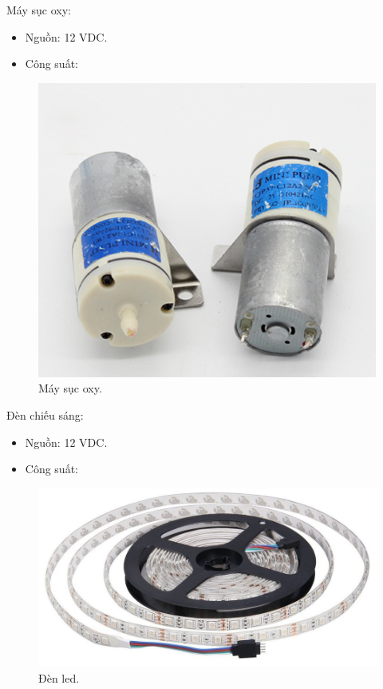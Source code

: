 \documentclass[a4paper,12pt,oneside]{article}
\begin{document}
Máy sục oxy:
\begin{itemize}
\item Nguồn: 12 VDC.
\item Công suất:
\end{itemize}
\begin{figure}[h!]
\begin{center}
\includegraphics[scale=0.7]{hinh/oxi.png}
\end{center}
\caption{Máy sục oxy.}
\end{figure}

Đèn chiếu sáng:
\begin{itemize}
\item Nguồn: 12 VDC. 
\item Công suất:
\end{itemize}
\begin{figure}[h!]
\begin{center}
\includegraphics[scale=0.4]{hinh/led.jpg}
\end{center}
\caption{Đèn led.}
\end{figure}
\end{document}
